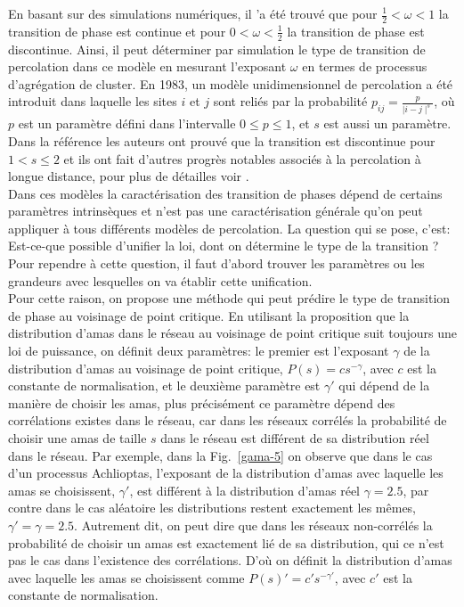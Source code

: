 En basant sur des simulations numériques, il 'a été trouvé que pour $\frac{1}{2}<\omega<1$ la transition de phase est continue et pour $0<\omega<\frac{1}{2}$ la transition de phase est discontinue. Ainsi, il peut déterminer par simulation le type de transition de percolation dans ce modèle en mesurant l'exposant $\omega$ en termes de processus d'agrégation de cluster. En 1983, un modèle unidimensionnel de percolation a été introduit \cite{Schulman1983} dans laquelle les sites $i$ et $j$ sont reliés par la probabilité $p_{ij}=\frac{p}{\mid i-j\mid^s}$, où $p$ est un paramètre défini dans l'intervalle $0\leq p\leq1$, et $s$ est aussi un paramètre. Dans la référence \cite{Aizenman-Newman1986} les auteurs ont prouvé que la transition est discontinue pour $1<s\leq2$ et ils ont fait d'autres progrès notables associés à la percolation à longue distance, pour plus de détailles voir \cite{Lee-al2016}.\\
Dans ces modèles la caractérisation des transition de phases dépend de certains paramètres intrinsèques  et n'est pas une caractérisation générale qu'on peut appliquer à tous différents modèles de percolation. La question qui se pose, c'est: Est-ce-que possible d'unifier la loi, dont on détermine le type de la transition ? Pour rependre à cette question, il faut d'abord trouver les paramètres ou les grandeurs avec lesquelles on va établir cette unification.\\
Pour cette raison, on propose une méthode qui peut prédire le type de transition de phase au voisinage de point critique. En utilisant la proposition que la distribution d'amas dans le réseau au voisinage de point critique suit toujours une loi de puissance, on définit deux paramètres: le premier est l'exposant $\gamma$ de la distribution d'amas au voisinage de point critique, $P(s)=cs^{-\gamma}$, avec $c$ est la constante de normalisation, et le deuxième paramètre est $\gamma'$ qui dépend de la manière de choisir les amas, plus précisément ce paramètre dépend des corrélations existes dans le réseau, car dans les réseaux corrélés la probabilité de choisir une amas de taille $s$ dans le réseau est différent de sa distribution réel dans le réseau. Par exemple, dans la Fig.~\ref{gama-5} on observe que dans le cas d'un processus Achlioptas, l'exposant de la distribution d'amas avec laquelle les amas se choisissent, $\gamma'$, est différent à la distribution d'amas réel $\gamma=2.5$, par contre dans le cas aléatoire les distributions restent exactement les mêmes, $\gamma'=\gamma=2.5$. Autrement dit, on peut dire que dans les réseaux non-corrélés la probabilité de choisir un amas est exactement lié de sa distribution, qui ce n'est pas le cas dans l'existence des corrélations. D'où on définit la distribution d'amas avec laquelle les amas se choisissent comme $P(s)'=c's^{-\gamma'}$, avec $c'$ est la constante de normalisation.
